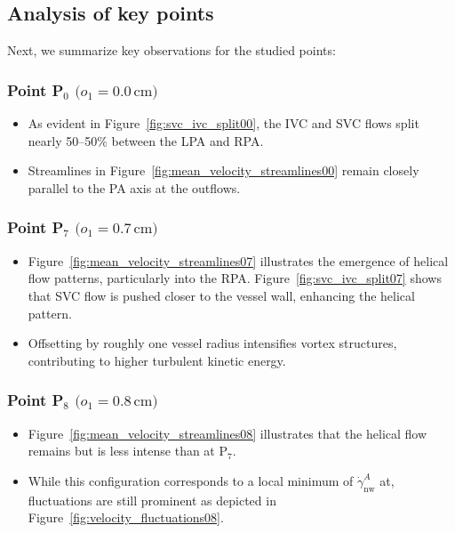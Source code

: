 \subsection*{Analysis of key points}
\noindent
Next, we summarize key observations for the studied points:
\subsubsection*{Point P\(_0\) \(\bigl(o_1 = 0.0\,\mathrm{cm}\bigr)\)}
\begin{itemize}
	\item As evident in Figure~\ref{fig:svc_ivc_split00}, the IVC and SVC flows split nearly 50--50\% between the LPA and RPA. 
	\item Streamlines in Figure~\ref{fig:mean_velocity_streamlines00} remain closely parallel to the PA axis at the outflows.
\end{itemize}
\subsubsection*{Point P\(_7\) \(\bigl(o_1 = 0.7\,\mathrm{cm}\bigr)\)}
\begin{itemize}
	\item Figure~\ref{fig:mean_velocity_streamlines07} illustrates the emergence of helical flow patterns, particularly into the RPA. Figure~\ref{fig:svc_ivc_split07} shows that SVC flow is pushed closer to the vessel wall, enhancing the helical pattern.
	\item Offsetting by roughly one vessel radius intensifies vortex structures, contributing to higher turbulent kinetic energy.
\end{itemize}

\subsubsection*{Point P\(_8\) \(\bigl(o_1 = 0.8\,\mathrm{cm}\bigr)\)}
\begin{itemize}
	\item Figure~\ref{fig:mean_velocity_streamlines08} illustrates that the helical flow remains but is less intense than at P\(_7\).
	\item While this configuration corresponds to a local minimum of $\dot{\gamma}^{A}_{\text{nw}}$ at, fluctuations are still prominent as depicted in Figure~\ref{fig:velocity_fluctuations08}.
\end{itemize}

